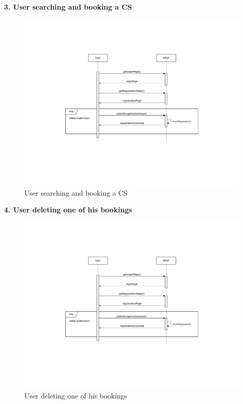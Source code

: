\documentclass[11pt]{article}
\begin{document}
\begin{description}
    \item \textbf{3. User searching and booking a CS}
    \begin{figure}[!ht]
        \centerline{
            \includegraphics[page={3}, trim=1.3cm 1.5cm 1.3cm 3cm, width=1.1\linewidth, clip]{SequenceDiagrams.pdf}
        }
        \caption{User searching and booking a CS}
    \end{figure}
    
    \newpage
    
    \item \textbf{4. User deleting one of his bookings}
    \begin{figure}[!ht]
        \centering
        \includegraphics[page={4}, trim=7cm 8cm 6cm 3cm, width=0.8\linewidth, clip]{SequenceDiagrams.pdf}
        \caption{User deleting one of his bookings}
    \end{figure}
    

\end{description}
\end{document}
